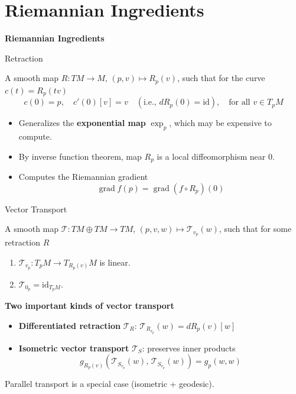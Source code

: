 \documentclass[10pt,aspectratio=169]{beamer}
\DeclareMathOperator{\grad}{grad}
\newcommand{\VT}{\mathcal{T}}
\begin{document}
\section{Riemannian Ingredients}

\begin{frame}{}
\centering
\vfill
{\Huge\bfseries Riemannian Ingredients}
\vfill
\end{frame}

\begin{frame}{Retraction}
\begin{definition}[Retraction]
A smooth map $R:TM\to M$, $(p,v)\mapsto R_p(v)$, such that for the curve $c(t) = R_p(tv)$
$$c(0) = p, \quad c'(0)[v] = v \quad (\text{i.e., } dR_p(0) = \mathrm{id}), \quad \text{for all } v\in T_pM$$
\end{definition}

\begin{itemize}
    \item Generalizes the \textbf{exponential map} $\exp_p$, which may be expensive to compute.
    \item By inverse function theorem, map $R_p$ is a local diffeomorphism near $0$.
    \item Computes the Riemannian gradient
    $$\grad f(p) = \grad(f\circ R_p)(0)$$
\end{itemize}
\end{frame}

\begin{frame}{Vector Transport}
\begin{definition}
A smooth map $\VT: TM\oplus TM \to TM$, $(p,v,w)\mapsto \VT_{v_p}(w)$, such that for some retraction $R$
\begin{enumerate}
    \item $\VT_{v_p}: T_pM \to T_{R_p(v)}M$ is linear.
    \item $\VT_{0_p} = \mathrm{id}_{T_pM}$.
\end{enumerate}
\end{definition}

\bigskip
\textbf{Two important kinds of vector transport}
\begin{itemize}
    \item \textbf{Differentiated retraction} $\VT_R$: $\VT_{R_{v_p}}(w) = dR_p(v)[w]$
    \item \textbf{Isometric vector transport} $\VT_S$: preserves inner products
    $$g_{R_p(v)}(\VT_{S_{v_p}}(w),\, \VT_{S_{v_p}}(w)) = g_p(w,w)$$
\end{itemize}
Parallel transport is a special case (isometric + geodesic).
\end{frame}
\end{document}
